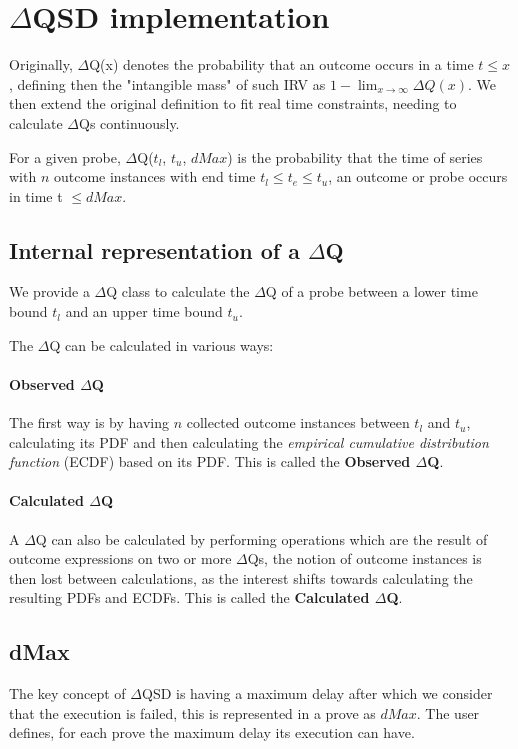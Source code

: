 \section{$\Delta$QSD implementation}

Originally, $\Delta$Q(x) denotes the probability that an outcome occurs in a time $t \le x$, defining then the "intangible mass" of such IRV as $1 - \lim_{x\to\infty} \Delta Q (x)$.
We then extend the original definition to fit real time constraints, needing to calculate $\Delta$Qs continuously.

For a given probe, $\Delta$Q($t_l$, $t_u$, $dMax$) is the probability that the time of series with $n$ outcome instances with end time $t_l \le t_e \le t_u$, an outcome or probe occurs in time t $\le dMax$.

\subsection{Internal representation of a $\Delta$Q}
    We provide a $\Delta$Q class to calculate the $\Delta$Q of a probe between a lower time bound $t_l$ and an upper time bound $t_u$.
    
    The $\Delta$Q can be calculated in various ways: 
    
    \paragraph{Observed $\Delta$Q}
    
    The first way is by having $n$ collected outcome instances between $t_l$ and $t_u$, calculating its PDF and then calculating the \textit{empirical cumulative distribution function} (ECDF) based on its PDF. This is called the \textbf{Observed $\Delta$Q}.
    
    \paragraph{Calculated $\Delta$Q}
    
    A $\Delta$Q can also be calculated by performing operations which are the result of outcome expressions on two or more $\Delta$Qs, the notion of outcome instances is then lost between calculations, as the interest shifts towards calculating the resulting PDFs and ECDFs. This is called the \textbf{Calculated $\Delta$Q}.
    
    \subsection{dMax}
        The key concept of $\Delta$QSD is having a maximum delay after which we consider that the execution is failed, this is represented in a prove as $dMax$. The user defines, for each prove the maximum delay its execution can have.

